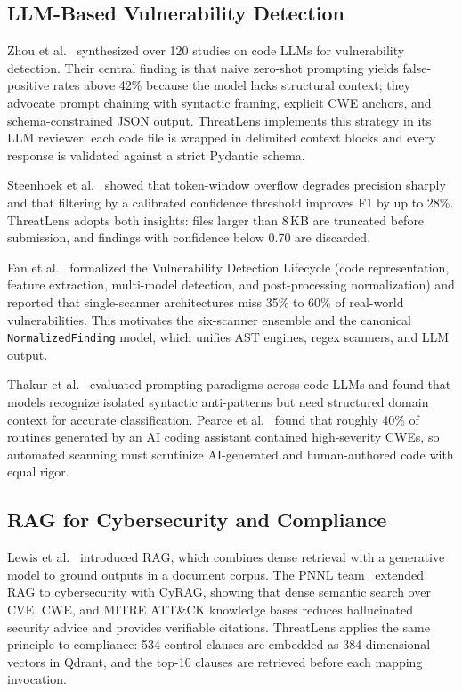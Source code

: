 \documentclass[conference]{IEEEtran}
\begin{document}
\subsection{LLM-Based Vulnerability Detection}
Zhou et al.~\cite{zhou2024llmvuln} synthesized over 120 studies on code LLMs for
vulnerability detection. Their central finding is that naive zero-shot prompting
yields false-positive rates above 42\% because the model lacks structural
context; they advocate prompt chaining with syntactic framing, explicit CWE
anchors, and schema-constrained JSON output. ThreatLens implements this strategy
in its LLM reviewer: each code file is wrapped in delimited context blocks and
every response is validated against a strict Pydantic schema.

Steenhoek et al.~\cite{steenhoek2024finetune} showed that token-window overflow
degrades precision sharply and that filtering by a calibrated confidence
threshold improves F1 by up to 28\%. ThreatLens adopts both insights: files
larger than 8\,KB are truncated before submission, and findings with confidence
below 0.70 are discarded.

Fan et al.~\cite{fan2025dlvuln} formalized the Vulnerability Detection Lifecycle
(code representation, feature extraction, multi-model detection, and
post-processing normalization) and reported that single-scanner architectures
miss 35\% to 60\% of real-world vulnerabilities. This motivates the six-scanner
ensemble and the canonical \texttt{NormalizedFinding} model, which unifies AST
engines, regex scanners, and LLM output.

Thakur et al.~\cite{thakur2023} evaluated prompting paradigms across code LLMs
and found that models recognize isolated syntactic anti-patterns but need
structured domain context for accurate classification. Pearce et
al.~\cite{pearce2022asleep} found that roughly 40\% of routines generated by an
AI coding assistant contained high-severity CWEs, so automated scanning must
scrutinize AI-generated and human-authored code with equal rigor.

\subsection{RAG for Cybersecurity and Compliance}
Lewis et al.~\cite{lewis2020rag} introduced RAG, which combines dense retrieval
with a generative model to ground outputs in a document corpus. The PNNL
team~\cite{pnnl2024cyrag} extended RAG to cybersecurity with CyRAG, showing that
dense semantic search over CVE, CWE, and MITRE ATT\&CK knowledge bases reduces
hallucinated security advice and provides verifiable citations. ThreatLens
applies the same principle to compliance: 534 control clauses are embedded as
384-dimensional vectors in Qdrant, and the top-10 clauses are retrieved before
each mapping invocation.
\end{document}
